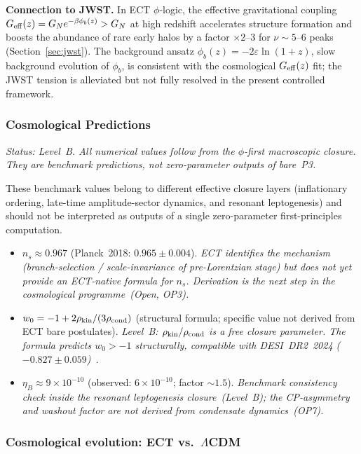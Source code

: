 \documentclass[11pt,a4paper]{article}
\numberwithin{equation}{section}
\begin{document}
\textbf{Connection to JWST.}
In ECT $\phi$-logic, the effective gravitational coupling
$G_{\rm eff}(z)=G_N e^{-\beta\phi_b(z)}>G_N$ at high redshift
accelerates structure formation and boosts the abundance of rare
early halos by a factor $\times2$--3 for $\nu\sim5$--6 peaks
(Section~\ref{sec:jwst}).
The background ansatz $\phi_b(z)=-2\varepsilon\ln(1+z)$,
slow background evolution of $\phi_b$, is consistent with the cosmological
$G_{\rm eff}(z)$ fit; the JWST tension is alleviated but not
fully resolved in the present controlled framework.



\subsubsection*{Cosmological Predictions}

\textit{Status: Level~B. All numerical values follow
from the $\phi$-first macroscopic closure. They are
benchmark predictions, not zero-parameter outputs
of bare~P3.}

These benchmark values belong to different effective
closure layers (inflationary ordering, late-time
amplitude-sector dynamics, and resonant leptogenesis) and
should not be interpreted as outputs of a single
zero-parameter first-principles computation.

\begin{itemize}
\item $n_s \approx 0.967$ (Planck~2018: $0.965\pm0.004$).
\textit{ECT identifies the mechanism (branch-selection /
scale-invariance of pre-Lorentzian stage) but does not yet provide
an ECT-native formula for $n_s$.  Derivation is the next step in
the cosmological programme~(Open, OP3).}

\item $w_0 = -1+2\rho_{\rm kin}/(3\rho_{\rm cond})$ (structural formula;
specific value not derived from ECT bare postulates).
\textit{Level~B: $\rho_{\rm kin}/\rho_{\rm cond}$ is a free closure parameter.
The formula predicts $w_0>-1$ structurally, compatible with
DESI~DR2~2024 ($-0.827\pm0.059$)~\cite{DESI2024}.}

\item $\eta_B \approx 9\times10^{-10}$
(observed: $6\times10^{-10}$; factor $\sim\!1.5$).
\textit{Benchmark consistency check inside the resonant leptogenesis
closure~(Level~B); the CP-asymmetry and washout factor are not
derived from condensate dynamics~(OP7).}
\end{itemize}

\subsubsection*{Cosmological evolution: ECT vs.\ \texorpdfstring{$\Lambda$}{Lambda}CDM}
\label{sec:cosmo_evolution_comparison}
\end{document}
